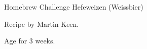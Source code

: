 \begin{recipe}{Homebrew Challenge Hefeweizen (Weissbier)}

\begin{aboutblock}
Recipe by Martin Keen.
\sourcehomebrewchallenge
\end{aboutblock}


\begin{methodandtiming}

\begin{mashsteps}
\end{mashsteps}

\begin{fermentationsteps}
\end{fermentationsteps}

\begin{directions}
Age for 3 weeks.
\end{directions}

\end{methodandtiming}

\recipebreak

\begin{ingredientsblock}

\begin{malts}
\end{malts}

\begin{hops}
\end{hops}


\end{ingredientsblock}

\end{recipe}


